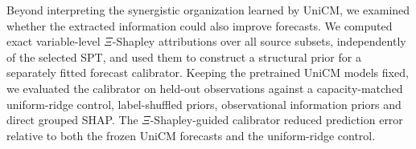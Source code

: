 \documentclass[fleqn,10pt]{wlscirep}
\theoremstyle{naturetheorem}
\begin{document}
Beyond interpreting the synergistic organization learned by UniCM, we examined whether the extracted information could also improve forecasts. We computed exact variable-level $\Xi$-Shapley attributions over all source subsets, independently of the selected SPT, and used them to construct a structural prior for a separately fitted forecast calibrator. Keeping the pretrained UniCM models fixed, we evaluated the calibrator on held-out observations against a capacity-matched uniform-ridge control, label-shuffled priors, observational information priors and direct grouped SHAP. The $\Xi$-Shapley-guided calibrator reduced prediction error relative to both the frozen UniCM forecasts and the uniform-ridge control.
\end{document}
